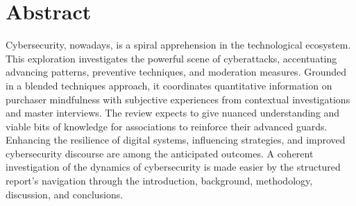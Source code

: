 \chapter*{\center \Large  Abstract}


Cybersecurity, nowadays, is a spiral apprehension in the technological ecosystem. This exploration investigates the powerful scene of cyberattacks, accentuating advancing patterns, preventive techniques, and moderation measures. Grounded in a blended techniques approach, it coordinates quantitative information on purchaser mindfulness with subjective experiences from contextual investigations and master interviews. The review expects to give nuanced understanding and viable bits of knowledge for associations to reinforce their advanced guards. Enhancing the resilience of digital systems, influencing strategies, and improved cybersecurity discourse are among the anticipated outcomes. A coherent investigation of the dynamics of cybersecurity is made easier by the structured report's navigation through the introduction, background, methodology, discussion, and conclusions.






